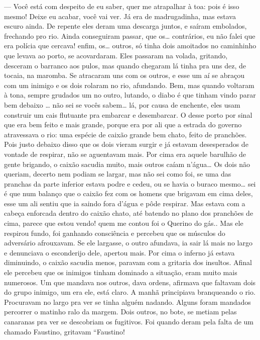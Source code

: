 --- Você está com despeito de eu saber, quer me atrapalhar à toa: pois é
isso mesmo! Deixe eu acabar, você vai ver. Já era de madrugadinha, mas
estava escuro ainda. De repente eles deram uma descarga juntos, e saíram
embolados, frechando pro rio. Ainda conseguiram passar, que os\ldots{}
contrários, eu não falei que era polícia que cercava! enfim, os\ldots{}
outros, só tinha dois amoitados no caminhinho que levava ao porto, se
acovardaram. Eles passaram na volada, gritando, desceram o barranco aos
pulos, mas quando chegaram lá tinha pra uns dez, de tocaia, na maromba.
Se atracaram uns com os outros, e esse um aí se abraçou com um inimigo e
os dois rolaram no rio, afundando. Bem, mas quando voltaram à tona,
sempre grudados um no outro, lutando, o diabo é que tinham vindo parar
bem debaixo \ldots{} não sei se vocês sabem\ldots{} lá, por causa de enchente,
eles usam construir um cais flutuante pra embarcar e desembarcar. O
desse porto por sinal que era bem feito e mais grande, porque era por
ali que a estrada do governo atravessava o rio: uma espécie de caixão
grande bem chato, feito de pranchões. Pois justo debaixo disso que os
dois vieram surgir e já estavam desesperados de vontade de respirar, não
se aguentavam mais. Por cima era aquele barulhão de gente brigando, o
caixão sacudia muito, mais outros caíam n'água\ldots{} Os dois não queriam,
decerto nem podiam se largar, mas não sei como foi, se uma das pranchas
da parte inferior estava podre e cedeu, ou se havia o buraco mesmo\ldots{}
sei é que num balanço que o caixão fez com os homens que brigavam em
cima deles, esse um ali sentiu que ia saindo fora d'água e pôde
respirar. Mas estava com a cabeça enforcada dentro do caixão chato, até
batendo no plano dos pranchões de cima, parece que estou vendo! quem me
contou foi o Querino do gás.. Mas ele respirou fundo, foi ganhando
consciência e percebeu que os músculos do adversário afrouxavam. Se ele
largasse, o outro afundava, ia sair lá mais no largo e denunciava o
esconderijo dele, apertou mais. Por cima o inferno já estava diminuindo,
o caixão sacudia menos, paravam com a gritaria dos insultos. Afinal ele
percebeu que os inimigos tinham dominado a situação, eram muito mais
numerosos. Um que mandava nos outros, dava ordens, afirmava que faltavam
dois do grupo inimigo, um era ele, está claro. A manhã principiava
branqueando o rio. Procuravam no largo pra ver se tinha alguém nadando.
Alguns foram mandados percorrer o matinho ralo da margem. Dois outros,
no bote, se metiam pelas canaranas pra ver se descobriam os fugitivos.
Foi quando deram pela falta de um chamado Faustino, gritavam ``Faustino!
